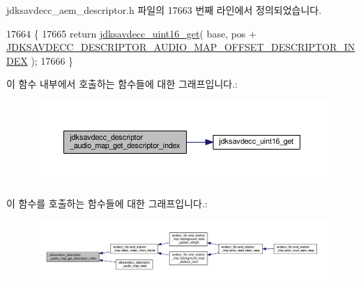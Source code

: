 jdksavdecc\+\_\+aem\+\_\+descriptor.\+h 파일의 17663 번째 라인에서 정의되었습니다.


\begin{DoxyCode}
17664 \{
17665     \textcolor{keywordflow}{return} \hyperlink{group__endian_ga3fbbbc20be954aa61e039872965b0dc9}{jdksavdecc\_uint16\_get}( base, pos + 
      \hyperlink{group__descriptor__audio__map_ga59489041fea75ac82ceebf16d1c54f1c}{JDKSAVDECC\_DESCRIPTOR\_AUDIO\_MAP\_OFFSET\_DESCRIPTOR\_INDEX}
       );
17666 \}
\end{DoxyCode}


이 함수 내부에서 호출하는 함수들에 대한 그래프입니다.\+:
\nopagebreak
\begin{figure}[H]
\begin{center}
\leavevmode
\includegraphics[width=350pt]{group__descriptor__audio__map_ga9077f7e1cdcabda7ff66624904e2464d_cgraph}
\end{center}
\end{figure}




이 함수를 호출하는 함수들에 대한 그래프입니다.\+:
\nopagebreak
\begin{figure}[H]
\begin{center}
\leavevmode
\includegraphics[width=350pt]{group__descriptor__audio__map_ga9077f7e1cdcabda7ff66624904e2464d_icgraph}
\end{center}
\end{figure}


